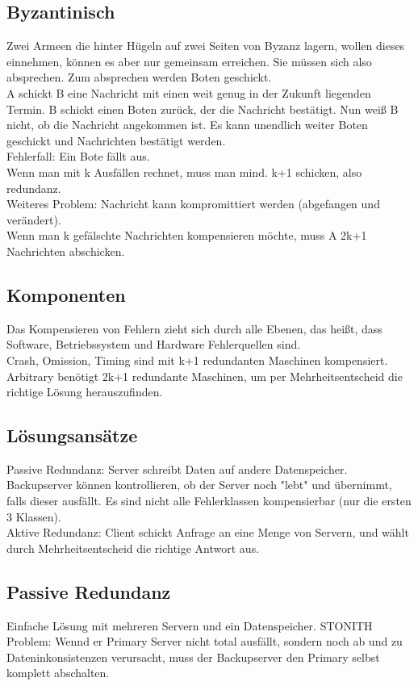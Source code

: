 \documentclass[a4paper]{article}
\begin{document}
\subsection{Byzantinisch}
Zwei Armeen die hinter Hügeln auf zwei Seiten von Byzanz lagern, wollen dieses einnehmen, können es aber nur gemeinsam erreichen. Sie müssen sich also absprechen. Zum absprechen werden Boten geschickt. \\
A schickt B eine Nachricht mit einen weit genug in der Zukunft liegenden Termin. B schickt einen Boten zurück, der die Nachricht bestätigt. Nun weiß B nicht, ob die Nachricht angekommen ist. Es kann unendlich weiter Boten geschickt und Nachrichten bestätigt werden.\\
Fehlerfall: Ein Bote fällt aus.\\
Wenn man mit k Ausfällen rechnet, muss man mind. k+1 schicken, also redundanz.\\
Weiteres Problem: Nachricht kann kompromittiert werden (abgefangen und verändert).\\
Wenn man k gefälschte Nachrichten kompensieren möchte, muss A 2k+1 Nachrichten abschicken.\\
\subsection{Komponenten}
Das Kompensieren von Fehlern zieht sich durch alle Ebenen, das heißt, dass Software, Betriebssystem und Hardware Fehlerquellen sind.\\
Crash, Omission, Timing sind mit k+1 redundanten Maschinen kompensiert. Arbitrary benötigt 2k+1 redundante Maschinen, um per Mehrheitsentscheid die richtige Lösung herauszufinden.
\subsection{Lösungsansätze}
Passive Redundanz: Server schreibt Daten auf andere Datenspeicher. Backupserver können kontrollieren, ob der Server noch "lebt" und übernimmt, falls dieser ausfällt. Es sind nicht alle Fehlerklassen kompensierbar (nur die ersten 3 Klassen).\\
Aktive Redundanz: Client schickt Anfrage an eine Menge von Servern, und wählt durch Mehrheitsentscheid die richtige Antwort aus.
\subsection{Passive Redundanz}
Einfache Lösung mit mehreren Servern und ein Datenspeicher. STONITH Problem: Wennd er Primary Server nicht total ausfällt, sondern noch ab und zu Dateninkonsistenzen verursacht, muss der Backupserver den Primary selbst komplett abschalten.
\end{document}
